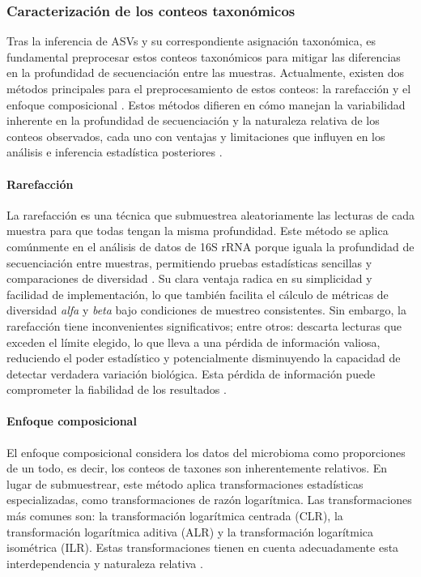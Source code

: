 \subsubsection{Caracterización de los conteos taxonómicos}

Tras la inferencia de ASVs y su correspondiente asignación taxonómica, es fundamental preprocesar estos conteos taxonómicos para mitigar las diferencias en la profundidad de secuenciación entre las muestras. Actualmente, existen dos métodos principales para el preprocesamiento de estos conteos: la rarefacción y el enfoque composicional \cite{willis2019rarefaction, gloor2017microbiome}. Estos métodos difieren en cómo manejan la variabilidad inherente en la profundidad de secuenciación y la naturaleza relativa de los conteos observados, cada uno con ventajas y limitaciones que influyen en los análisis e inferencia estadística posteriores \cite{hong2022rarefy, peterson2023analysis}.

\paragraph{Rarefacción}

La rarefacción es una técnica que submuestrea aleatoriamente las lecturas de cada muestra para que todas tengan la misma profundidad. Este método se aplica comúnmente en el análisis de datos de 16S rRNA porque iguala la profundidad de secuenciación entre muestras, permitiendo pruebas estadísticas sencillas y comparaciones de diversidad \cite{willis2019rarefaction}. Su clara ventaja radica en su simplicidad y facilidad de implementación, lo que también facilita el cálculo de métricas de diversidad \textit{alfa} y \textit{beta} bajo condiciones de muestreo consistentes. Sin embargo, la rarefacción tiene inconvenientes significativos; entre otros: descarta lecturas que exceden el límite elegido, lo que lleva a una pérdida de información valiosa, reduciendo el poder estadístico y potencialmente disminuyendo la capacidad de detectar verdadera variación biológica. Esta pérdida de información puede comprometer la fiabilidad de los resultados \cite{peterson2023analysis, schloss2024waste}.

\paragraph{Enfoque composicional}

El enfoque composicional considera los datos del microbioma como proporciones de un todo, es decir, los conteos de taxones son inherentemente relativos. En lugar de submuestrear, este método aplica transformaciones estadísticas especializadas, como transformaciones de razón logarítmica. Las transformaciones más comunes son: la transformación logarítmica centrada (CLR), la transformación logarítmica aditiva (ALR) y la transformación logarítmica isométrica (ILR). Estas transformaciones tienen en cuenta adecuadamente esta interdependencia y naturaleza relativa \cite{gloor2017microbiome}.

